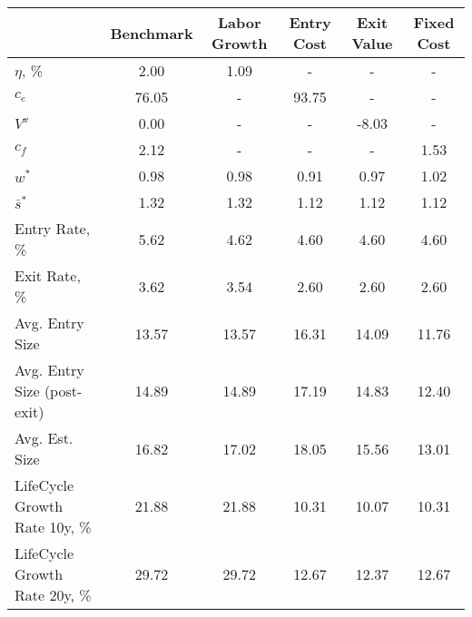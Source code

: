 \begin{tabular}{lccccc}
\toprule
{} & Benchmark & Labor Growth & Entry Cost & Exit Value & Fixed Cost \\
\midrule
$\eta$, \%                    &      2.00 &         1.09 &          - &          - &          - \\
$c_e$                         &     76.05 &            - &      93.75 &          - &          - \\
$V^x$                         &      0.00 &            - &          - &      -8.03 &          - \\
$c_f$                         &      2.12 &            - &          - &          - &       1.53 \\
$w^*$                         &      0.98 &         0.98 &       0.91 &       0.97 &       1.02 \\
$\bar{s}^*$                   &      1.32 &         1.32 &       1.12 &       1.12 &       1.12 \\
Entry Rate, \%                &      5.62 &         4.62 &       4.60 &       4.60 &       4.60 \\
Exit Rate, \%                 &      3.62 &         3.54 &       2.60 &       2.60 &       2.60 \\
Avg. Entry Size               &     13.57 &        13.57 &      16.31 &      14.09 &      11.76 \\
Avg. Entry Size (post-exit)   &     14.89 &        14.89 &      17.19 &      14.83 &      12.40 \\
Avg. Est. Size                &     16.82 &        17.02 &      18.05 &      15.56 &      13.01 \\
LifeCycle Growth Rate 10y, \% &     21.88 &        21.88 &      10.31 &      10.07 &      10.31 \\
LifeCycle Growth Rate 20y, \% &     29.72 &        29.72 &      12.67 &      12.37 &      12.67 \\
\bottomrule
\end{tabular}
